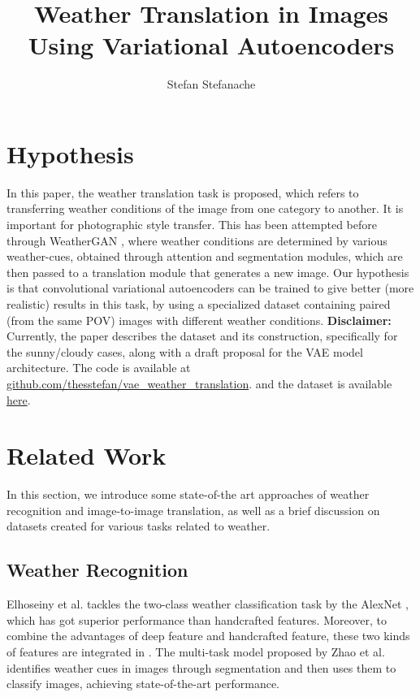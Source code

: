 \documentclass[11pt]{article}
\title{\textbf{Weather Translation in Images Using Variational Autoencoders}}
\author{Stefan Stefanache}
\begin{document}
    \maketitle

    \section{Hypothesis}
    In this paper, the weather translation task is proposed, which 
    refers to transferring weather conditions of the image from one category 
    to another. It is important for photographic style transfer. This has been 
    attempted before through WeatherGAN \cite{DBLP:journals/corr/abs-2103-05422}, where weather 
    conditions are determined by various weather-cues, obtained through 
    attention and segmentation modules, which are then passed to a translation module 
    that generates a new image. Our hypothesis is that convolutional variational autoencoders 
    can be trained to give better (more realistic) results in this task, by 
    using a specialized dataset containing paired (from the same POV) images with different
    weather conditions. \textbf{Disclaimer:} Currently, the paper describes the dataset and
    its construction, specifically for the sunny/cloudy cases, along with a draft proposal
    for the VAE model architecture. The code is available at 
    \href{https://github.com/thesstefan/vae_weather_translation}
    {github.com/thesstefan/vae\_weather\_translation}.
    and the dataset is available 
    \href{https://drive.google.com/file/d/1q7OjUZgz2ZzPzfsHPzbNluJye450oid9/view?usp=share_link}
    {here}.
    \section{Related Work}

    In this section, we introduce some state-of-the art approaches of weather recognition
    and image-to-image translation, as well as a brief discussion on datasets created 
    for various tasks related to weather.

    \subsection{Weather Recognition}
    Elhoseiny et al. \cite{7351424} tackles the two-class weather classification 
    task by the AlexNet \cite{10.1145/3065386}, which has got superior performance 
    than handcrafted features. Moreover, to combine the advantages of deep feature 
    and handcrafted feature, these two kinds of features are integrated 
    in \cite{7784804}. The multi-task model proposed by 
    Zhao et al. \cite{ZHAO2019272} identifies weather cues in images through segmentation
    and then uses them to classify images, achieving state-of-the-art performance.
\end{document}

